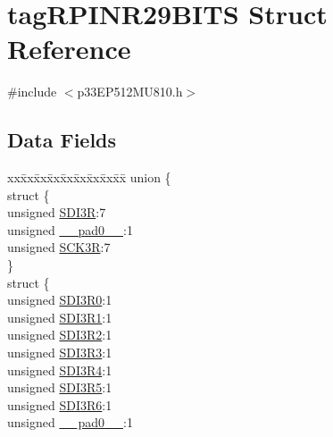 \hypertarget{structtag_r_p_i_n_r29_b_i_t_s}{}\section{tag\+R\+P\+I\+N\+R29\+B\+I\+TS Struct Reference}
\label{structtag_r_p_i_n_r29_b_i_t_s}


{\ttfamily \#include $<$p33\+E\+P512\+M\+U810.\+h$>$}

\subsection*{Data Fields}
\begin{DoxyCompactItemize}
\item 
\begin{tabbing}
xx\=xx\=xx\=xx\=xx\=xx\=xx\=xx\=xx\=\kill
union \{\\
\>struct \{\\
\>\>unsigned \hyperlink{structtag_r_p_i_n_r29_b_i_t_s_a411689a716ef24ee0938893c88bb169c}{SDI3R}:7\\
\>\>unsigned \hyperlink{structtag_r_p_i_n_r29_b_i_t_s_adf71f3d8410c1f1dbbc96680a92c49af}{\_\_pad0\_\_}:1\\
\>\>unsigned \hyperlink{structtag_r_p_i_n_r29_b_i_t_s_a4fe8f3abcfe1290a188d3decd173c743}{SCK3R}:7\\
\>\} \\
\>struct \{\\
\>\>unsigned \hyperlink{structtag_r_p_i_n_r29_b_i_t_s_a2e72e512d7799a451afbb826bf275fb0}{SDI3R0}:1\\
\>\>unsigned \hyperlink{structtag_r_p_i_n_r29_b_i_t_s_a723490d6a4d3f0d3ecbf66991f2be144}{SDI3R1}:1\\
\>\>unsigned \hyperlink{structtag_r_p_i_n_r29_b_i_t_s_a8a0418873ab17dee4cb245ceec37fa88}{SDI3R2}:1\\
\>\>unsigned \hyperlink{structtag_r_p_i_n_r29_b_i_t_s_a77153c4c68325784027629d96883ce54}{SDI3R3}:1\\
\>\>unsigned \hyperlink{structtag_r_p_i_n_r29_b_i_t_s_ab15820027cc24090cb9d87552646ebae}{SDI3R4}:1\\
\>\>unsigned \hyperlink{structtag_r_p_i_n_r29_b_i_t_s_af7f63d05bf9a7633fa00feeecbf36db2}{SDI3R5}:1\\
\>\>unsigned \hyperlink{structtag_r_p_i_n_r29_b_i_t_s_af54ac19014318287133707056c4a2d14}{SDI3R6}:1\\
\>\>unsigned \hyperlink{structtag_r_p_i_n_r29_b_i_t_s_adf71f3d8410c1f1dbbc96680a92c49af}{\_\_pad0\_\_}:1\\

\end{tabbing}
\end{DoxyCompactItemize}

